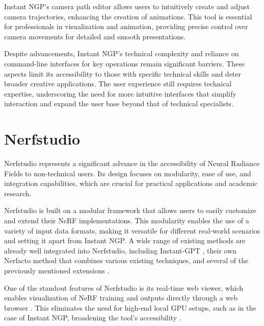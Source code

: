 Instant NGP's camera path editor allows users to intuitively create and adjust camera trajectories, enhancing the creation of animations.
This tool is essential for professionals in visualization and animation, providing precise control over camera movements for detailed and smooth presentations.

Despite advancements, Instant NGP's technical complexity and reliance on command-line interfaces for key operations remain significant barriers.
These aspects limit its accessibility to those with specific technical skills and deter broader creative applications.
The user experience still requires technical expertise, underscoring the need for more intuitive interfaces that simplify interaction and expand the user base beyond that of technical specialists.

\section{Nerfstudio}
\label{sec:related:nerfstudio}

Nerfstudio \cite{tancik_nerfstudio_2023} represents a significant advance in the accessibility of Neural Radiance Fields to non-technical users.
Its design focuses on modularity, ease of use, and integration capabilities, which are crucial for practical applications and academic research.

Nerfstudio is built on a modular framework that allows users to easily customize and extend their NeRF implementations.
This modularity enables the use of a variety of input data formats, making it versatile for different real-world scenarios and setting it apart from Instant NGP.
A wide range of existing methods are already well integrated into Nerfstudio, including Instant-GPT \cite{muller_instant_2022}, their own Nerfacto \cite{noauthor_nerfacto_nodate} method that combines various existing techniques, and several of the previously mentioned extensions \cite{haque_instruct-nerf2nerf_2023,jan-niklas_dihlmann_signerf_2024}.

One of the standout features of Nerfstudio is its real-time web viewer, which enables visualization of NeRF training and outputs directly through a web browser .
This eliminates the need for high-end local GPU setups, such as in the case of Instant NGP, broadening the tool's accessibility \cite{noauthor_nerfstudio-projectviser_2024}.


